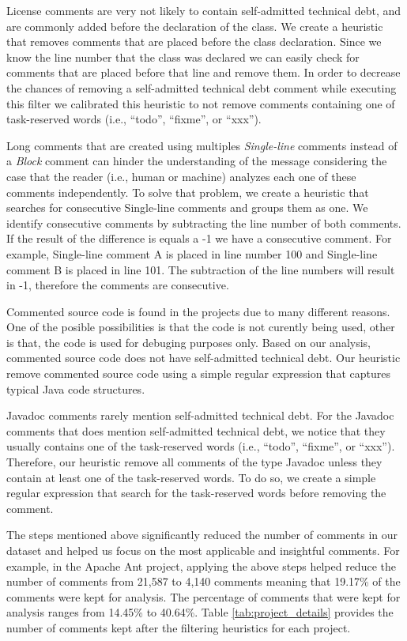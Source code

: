 License comments are very not likely to contain self-admitted technical debt, and are commonly added before the declaration of the class. We create a heuristic that removes comments that are placed before the class declaration. Since we know the line number that the class was declared we can easily check for comments that are placed before that line and remove them. In order to decrease the chances of removing a self-admitted technical debt comment while executing this filter we calibrated this heuristic to not remove comments containing one of task-reserved words (i.e., ``todo'', ``fixme'', or ``xxx'').

Long comments that are created using multiples \emph{Single-line} comments instead of a \emph{Block} comment can hinder the understanding of the message considering the case that the reader (i.e., human or machine) analyzes each one of these comments independently. To solve that problem, we create a heuristic that searches for consecutive Single-line comments and groups them as one. We identify consecutive comments by subtracting the line number of both comments. If the result of the difference is equals a -1 we have a consecutive comment. For example, Single-line comment A is placed in line number 100 and Single-line comment B is placed in line 101. The subtraction of the line numbers will result in -1, therefore the comments are consecutive.
 
Commented source code is found in the projects due to many different reasons. One of the posible possibilities is that the code is not curently being used, other is that, the code is used for debuging purposes only. Based on our analysis, commented source code does not have self-admitted technical debt. Our heuristic remove commented source code using a simple regular expression that captures typical Java code structures.

Javadoc comments rarely mention self-admitted technical debt. For the Javadoc comments that does mention self-admitted technical debt, we notice that they usually contains one of the task-reserved words (i.e., ``todo'', ``fixme'', or ``xxx''). Therefore, our heuristic remove all comments of the type Javadoc unless they contain at least one of the task-reserved words. To do so, we create a simple regular expression that search for the task-reserved words before removing the comment.  

The steps mentioned above significantly reduced the number of comments in our dataset and helped us focus on the most applicable and insightful comments. For example, in the Apache Ant project, applying the above steps helped reduce the number of comments from 21,587 to 4,140 comments meaning that 19.17\% of the comments were kept for analysis. The percentage of comments that were kept for analysis ranges from 14.45\% to 40.64\%. Table \ref{tab:project_details} provides the number of comments kept after the filtering heuristics for each project.

